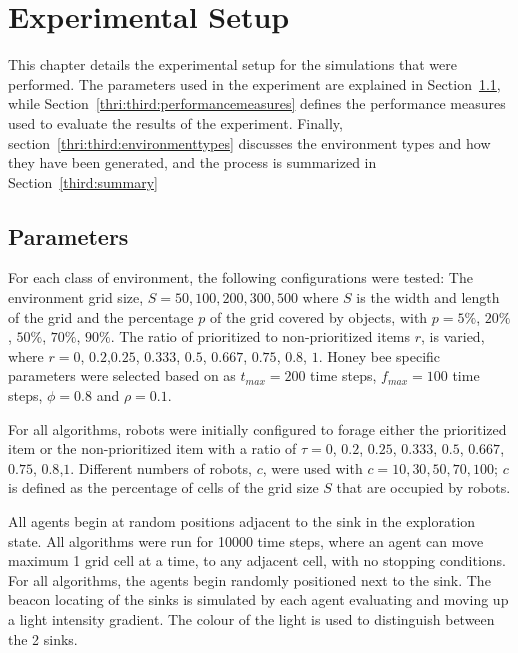 
\chapter{Experimental Setup}
\label{chap:third}


This chapter details the experimental setup for the simulations that were performed. The parameters used in the experiment are explained in Section~\ref{parameters}, while Section~\ref{thri:third:performancemeasures} defines the performance measures used to evaluate the results of the experiment. Finally, section~\ref{thri:third:environmenttypes} discusses the environment types and how they have been generated, and the process is summarized in Section~\ref{third:summary}


\section{Parameters}
\label{parameters}

For each class of environment, the following configurations were tested: The environment grid size, $S=50,100,200,300, 500$ where $S$ is the width and length of the grid and the percentage $p$ of the grid covered by objects, with $p= 5\%$, $20\%$, $50\%$, $70\%$, $90\%$. The ratio of prioritized to non-prioritized items $r$, is varied, where $r=0$, $0.2$,$0.25$, $0.333$, $0.5$, $0.667$, $0.75$, $0.8$, $1$. Honey bee specific parameters were selected based on \cite{seeley2009wisdom} as 
$t_{max}=200$ time steps, $f_{max}=100$ time steps, $\phi=0.8$ and $\rho=0.1$.

For all algorithms, robots were initially configured to forage either the prioritized item or the non-prioritized item with a ratio of $\tau=0$, $0.2$, $0.25$, $0.333$, $0.5$, $0.667$, $0.75$, $0.8$,$1$. Different numbers of robots, $c$, were used with $c=10, 30, 50, 70, 100$; $c$ is defined as the percentage of cells of the grid size $S$ that are occupied by robots.

All agents begin at random positions adjacent to the sink in the exploration state. All algorithms were run for 10000 time steps, where an agent can move maximum 1 grid cell at a time, to any adjacent cell, with no stopping conditions. For all algorithms, the agents begin randomly positioned next to the sink. The beacon locating of the sinks is simulated by each agent evaluating and moving up a light intensity gradient. The colour of the light is used to distinguish between the 2 sinks.

